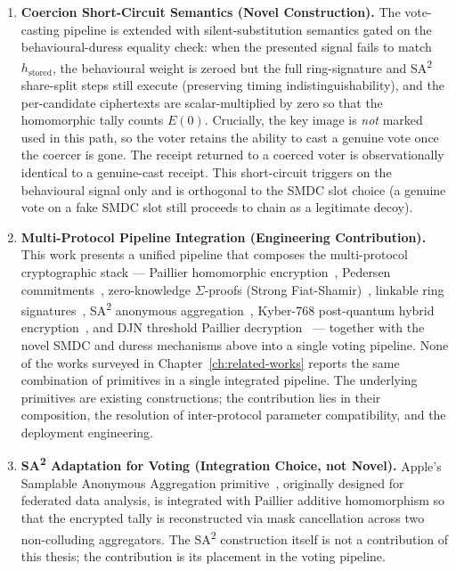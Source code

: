 \begin{enumerate}
    \item \textbf{Coercion Short-Circuit Semantics (Novel Construction).} The vote-casting pipeline is extended with silent-substitution semantics gated on the behavioural-duress equality check: when the presented signal fails to match $h_{\text{stored}}$, the behavioural weight is zeroed but the full ring-signature and SA\textsuperscript{2} share-split steps still execute (preserving timing indistinguishability), and the per-candidate ciphertexts are scalar-multiplied by zero so that the homomorphic tally counts $E(0)$. Crucially, the key image is \emph{not} marked used in this path, so the voter retains the ability to cast a genuine vote once the coercer is gone. The receipt returned to a coerced voter is observationally identical to a genuine-cast receipt. This short-circuit triggers on the behavioural signal only and is orthogonal to the SMDC slot choice (a genuine vote on a fake SMDC slot still proceeds to chain as a legitimate decoy).

    \item \textbf{Multi-Protocol Pipeline Integration (Engineering Contribution).} This work presents a unified pipeline that composes the multi-protocol cryptographic stack --- Paillier homomorphic encryption~\cite{paillier1999}, Pedersen commitments~\cite{pedersen1991}, zero-knowledge $\Sigma$-proofs (Strong Fiat-Shamir)~\cite{bernhard2012}, linkable ring signatures~\cite{liu2004}, SA\textsuperscript{2} anonymous aggregation~\cite{sa2_apple}, Kyber-768 post-quantum hybrid encryption~\cite{nist_kyber}, and DJN threshold Paillier decryption~\cite{damgard2010} --- together with the novel SMDC and duress mechanisms above into a single voting pipeline. None of the works surveyed in Chapter~\ref{ch:related-works} reports the same combination of primitives in a single integrated pipeline. The underlying primitives are existing constructions; the contribution lies in their composition, the resolution of inter-protocol parameter compatibility, and the deployment engineering.

    \item \textbf{SA\textsuperscript{2} Adaptation for Voting (Integration Choice, not Novel).} Apple's Samplable Anonymous Aggregation primitive~\cite{sa2_apple}, originally designed for federated data analysis, is integrated with Paillier additive homomorphism so that the encrypted tally is reconstructed via mask cancellation across two non-colluding aggregators. The SA\textsuperscript{2} construction itself is not a contribution of this thesis; the contribution is its placement in the voting pipeline.


\end{enumerate}
